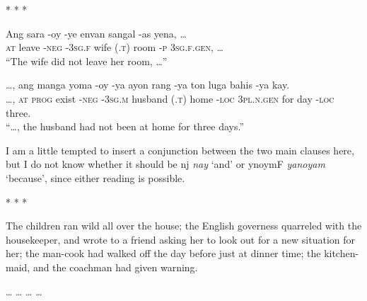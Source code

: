 \documentclass[12pt,paper=letter]{scrartcl}
\newcommand{\fw}[1]{\textit{#1}} %
\newcommand{\q}[1]{\enquote{#1}} %
\newcommand{\qq}[1]{\enquote*{#1}} %
\newcommand{\divider}{\vspace{0.5\baselineskip} \centerline{* * *} \vspace{0.5\baselineskip}}
\newcommand{\mor}[1]{\textsc{\lowercase{#1}}}
\newcommand{\ayr}[1]{{\Tagati #1}}
\begin{document}
\divider

\begin{exe}  %
    \ex
    \begin{xlist}
	\ex \gll Ang sara -oy -ye envan {} sangal -as yena, … \\
	\mor{AT} leave \mor{-NEG} \mor{-3SG.F} wife \mor{(.T)} room \mor{-P} 
	    \mor{3SG.F.GEN}, … \\
	\glt \q{The wife did not leave her room, …}
	    
	\ex \gll …, ang manga yoma -oy -ya ayon {} rang -ya ton luga bahis -ya 
	    kay. \\
	…, \mor{AT} \mor{PROG} exist \mor{-NEG} \mor{-3SG.M} husband \mor{(.T)} 
	    home \mor{-LOC} \mor{3PL.N.GEN} for day \mor{-LOC} three. \\
	\glt \q{…, the husband had not been at home for three days.}
    \end{xlist}
\end{exe}

I am a little tempted to insert a conjunction between the two main clauses here,
but I do not know whether it should be \ayr{nj} \fw{nay} \qq{and} or \ayr{ynoymF}
\fw{yanoyam} \qq{because}, since either reading is possible.

\divider

The children ran wild all over the house; the English governess quarreled with the housekeeper, and wrote to a friend asking her to look out for a new situation for her; the man-cook had walked off the day before just at dinner time; the kitchen-maid, and the coachman had given warning.

\begin{exe}  %
    \ex
    \begin{xlist}
	\ex …
	\ex …
	\ex …
	\ex …
    \end{xlist}
\end{exe}


\printbibliography
\end{document}
